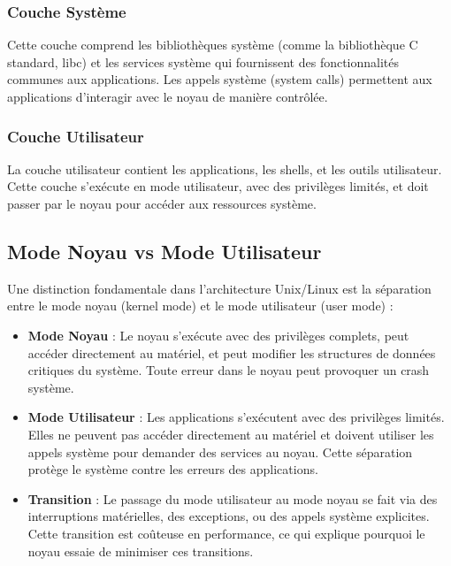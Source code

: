 \documentclass[12pt,a4paper]{article}
\begin{document}
\subsubsection{Couche Système}
Cette couche comprend les bibliothèques système (comme la bibliothèque C standard, libc) et les services système qui fournissent des fonctionnalités communes aux applications. Les appels système (system calls) permettent aux applications d'interagir avec le noyau de manière contrôlée.

\subsubsection{Couche Utilisateur}
La couche utilisateur contient les applications, les shells, et les outils utilisateur. Cette couche s'exécute en mode utilisateur, avec des privilèges limités, et doit passer par le noyau pour accéder aux ressources système.

\subsection{Mode Noyau vs Mode Utilisateur}

Une distinction fondamentale dans l'architecture Unix/Linux est la séparation entre le mode noyau (kernel mode) et le mode utilisateur (user mode) :

\begin{itemize}
    \item \textbf{Mode Noyau} : Le noyau s'exécute avec des privilèges complets, peut accéder directement au matériel, et peut modifier les structures de données critiques du système. Toute erreur dans le noyau peut provoquer un crash système.
    
    \item \textbf{Mode Utilisateur} : Les applications s'exécutent avec des privilèges limités. Elles ne peuvent pas accéder directement au matériel et doivent utiliser les appels système pour demander des services au noyau. Cette séparation protège le système contre les erreurs des applications.
    
    \item \textbf{Transition} : Le passage du mode utilisateur au mode noyau se fait via des interruptions matérielles, des exceptions, ou des appels système explicites. Cette transition est coûteuse en performance, ce qui explique pourquoi le noyau essaie de minimiser ces transitions.
\end{itemize}
\end{document}
